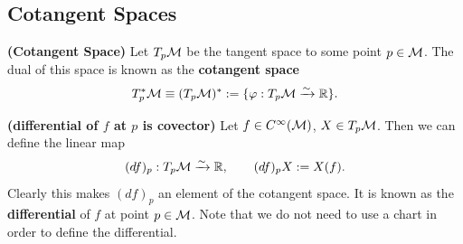 \documentclass[12pt]{article} %
\newcommand{\bfs}[1]{\textbf{({#1}) }}
\begin{document}
\subsection{Cotangent Spaces}
\bd\bfs{Cotangent Space}
    Let $T_p\mathcal{M}$ be the tangent space to some point $p\in\mathcal{M}$. The dual of this space is known as the \textbf{cotangent space}
    \begin{align*} 
        T^*_p\mathcal{M} \equiv (T_p\mathcal{M})^* := \{ \varphi : T_p\mathcal{M} \xrightarrow{\sim} \mathbb{R} \}.
    \end{align*} 
\ed 

\bd\bfs{differential of $f$ at $p$ is covector}
    Let $f\in C^{\infty}(\mathcal{M})$, $X\in T_p\mathcal{M}$. Then we can define the linear map 
    \begin{align*} 
        (df)_p : T_p\mathcal{M} \xrightarrow{\sim} \mathbb{R}, \qquad (df)_p X := X(f). 
    \end{align*} 
    Clearly this makes $(df)_p$ an element of the cotangent space. It is known as the \textbf{differential} of $f$ at point $p\in\mathcal{M}$.
\ed
\br 
    Note that we do not need to use a chart in order to define the differential.
\er 
\end{document}

